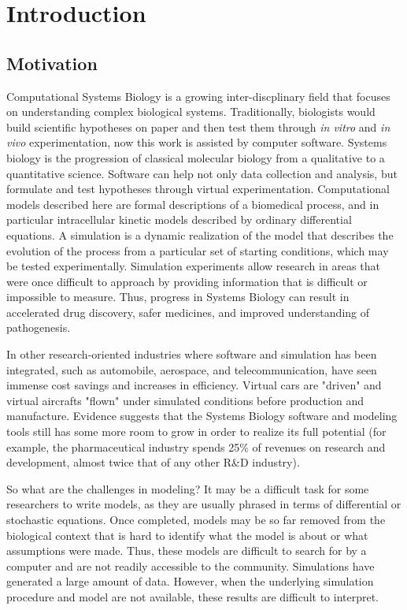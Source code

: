 \chapter{Introduction}

\section{Motivation}

Computational Systems Biology is a growing inter-discplinary field that focuses on understanding complex biological systems. \autocite{kitano2002computational}
Traditionally, biologists would build scientific hypotheses on paper and then test them through \textit{in vitro} and \textit{in vivo} experimentation, now this work is assisted by computer software.
Systems biology is the progression of classical molecular biology from a qualitative to a quantitative science.
Software can help not only data collection and analysis, but formulate and test hypotheses through virtual experimentation.
Computational models described here are formal descriptions of a biomedical process, and in particular intracellular kinetic models described by ordinary differential equations.
A simulation is a dynamic realization of the model that describes the evolution of the process from a particular set of starting conditions, which may be tested experimentally.
Simulation experiments allow research in areas that were once difficult to approach by providing information that is difficult or impossible to measure. \autocite{edwards2001silico}
Thus, progress in Systems Biology can result in accelerated drug discovery, safer medicines, and improved understanding of pathogenesis. \autocite{kitano2010grand, mack2004can}

In other research-oriented industries where software and simulation has been integrated, such as automobile, aerospace, and telecommunication, have seen immense cost savings and increases in efficiency.
Virtual cars are "driven" and virtual aircrafts "flown" under simulated conditions before production and manufacture. \autocite{ghosh2010connecting}
Evidence suggests that the Systems Biology software and modeling tools still has some more room to grow in order to realize its full potential (for example, the pharmaceutical industry spends 25\% of revenues on research and development, almost twice that of any other R\&D industry). \autocite{economist2005models}

So what are the challenges in modeling?
It may be a difficult task for some researchers to write models, as they are usually phrased in terms of differential or stochastic equations.
Once completed, models may be so far removed from the biological context that is hard to identify what the model is about or what assumptions were made.
Thus, these models are difficult to search for by a computer and are not readily accessible to the community.
Simulations have generated a large amount of data.
However, when the underlying simulation procedure and model are not available, these results are difficult to interpret.

